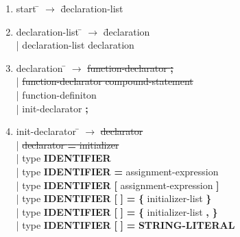 \documentclass[12pt]{article}
\begin{document}
\small
\begin{enumerate}
\item \begin{tabbing} start \= $\rightarrow$ \= declaration-list \\
\end{tabbing}

\item \begin{tabbing} declaration-list \= $\rightarrow$ \= declaration \\
	\> \hspace*{0.05cm} | \> declaration-list declaration \\
\end{tabbing}

\item \begin{tabbing} declaration \= $\rightarrow$ \= \sout{function-declarator \textbf{;}} \\
	\> \hspace*{0.05cm} | \> \sout{function-declarator compound-statement} \\
	\> \hspace*{0.05cm} | \> function-definiton \\
	\> \hspace*{0.05cm} | \> init-declarator \textbf{;} \\
\end{tabbing}

\item \begin{tabbing} init-declarator \= $\rightarrow$ \= \sout{declarator} \\
	\> \hspace*{0.05cm} | \> \sout{declarator \textbf{=} initializer} \\
	\> \hspace*{0.05cm} | \> type \textbf{IDENTIFIER}                                                                                                 \\
	\> \hspace*{0.05cm} | \> type \textbf{IDENTIFIER} \textbf{=} assignment-expression                                                              \\
	\> \hspace*{0.05cm} | \> type \textbf{IDENTIFIER} \textbf{[} assignment-expression \textbf{]}                                                 \\
	\> \hspace*{0.05cm} | \> type \textbf{IDENTIFIER} \textbf{[} \textbf{]} \textbf{=} \textbf{\{} initializer-list \textbf{\}}               \\
	\> \hspace*{0.05cm} | \> type \textbf{IDENTIFIER} \textbf{[} \textbf{]} \textbf{=} \textbf{\{} initializer-list \textbf{,} \textbf{\}}  \\
	\> \hspace*{0.05cm} | \> type \textbf{IDENTIFIER} \textbf{[} \textbf{]} \textbf{=} \textbf{STRING-LITERAL}                                  \\
\end{tabbing}



\end{enumerate}
\end{document}
